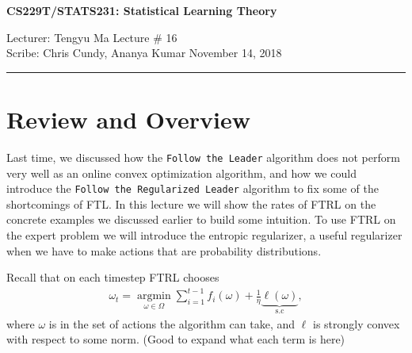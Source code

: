 \documentclass[11pt]{article}
\newcommand{\draftnotice}{\vbox to 0.25in{\noindent
   \raisebox{0.6in}[0in][0in]{\makebox[\textwidth][r]{\it
    DRAFT --- a final version will be posted shortly}}}
   \vspace{-.25in}\vspace{-\baselineskip}
}
\newcommand{\argmin}{\mathop{\text{argmin}}}
\begin{document}
\thispagestyle{empty}


\begin{center}
\bf\large CS229T/STATS231: Statistical Learning Theory
\end{center}

\noindent
Lecturer: Tengyu Ma   %
\hfill
Lecture \#               16
\\
Scribe:                  Chris Cundy, Ananya Kumar 
\hfill
November 14, 2018           %

\noindent
\rule{\textwidth}{1pt}

\medskip


\section{Review and Overview}
Last time, we discussed how the \texttt{Follow the Leader} algorithm does not perform very well as an online convex optimization algorithm, and how we could introduce the \texttt{Follow the Regularized Leader} algorithm to fix some of the shortcomings of FTL. In this lecture we will show the rates of FTRL on the concrete examples we discussed earlier to build some intuition. To use FTRL on the expert problem we will introduce the entropic regularizer, a useful regularizer when we have to make actions that are probability distributions.  

Recall that on each timestep FTRL chooses 
\begin{align}
    \omega_t = \underset{\omega \in \Omega}{\argmin}\sum_{i=1}^{t-1}f_i(\omega) + \frac{1}{\eta}\underbrace{\ell(\omega)}_{\mathrm{s.c}},
\end{align}
where \(\omega\) is in the set of actions the algorithm can take, and \(\ell\) is strongly convex with respect to some norm. (Good to expand what each term is here)
\end{document}
